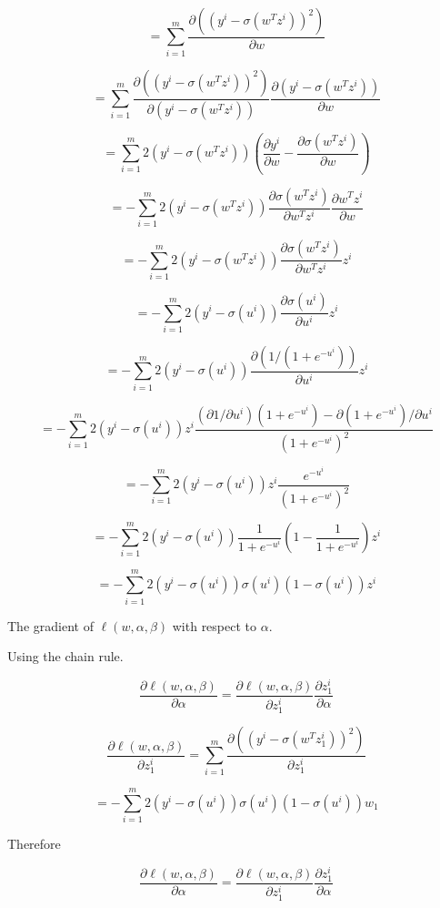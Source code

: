 \documentclass[twoside,10pt]{article}
\begin{document}
\begin{enumerate}
\begin{enumerate}
$$=\sum_{i=1}^m{\frac{\partial{((y^i - \sigma(w^T z^i))^2)}}{\partial{w}}}$$

$$=\sum_{i=1}^m{ \frac{\partial{((y^i - \sigma(w^T z^i))^2)}}{\partial{(y^i - \sigma(w^T z^i))}} \frac{\partial{(y^i - \sigma(w^T z^i))}}{\partial{w}} }$$

$$=\sum_{i=1}^m{2(y^i - \sigma(w^T z^i))(\frac{\partial{y^i}}{\partial{w}}   -   \frac{\partial{\sigma(w^T z^i)}}{\partial{w}})}$$

$$=- \sum_{i=1}^m{2(y^i - \sigma(w^T z^i)) \frac{\partial{\sigma(w^T z^i)}}{\partial{w^T z^i}} \frac{\partial{w^T z^i}}{\partial{w}}} $$

$$= - \sum_{i=1}^m{2(y^i - \sigma(w^T z^i)) \frac{\partial{\sigma(w^T z^i)}}{\partial{w^T z^i}} z^i}$$

$$=- \sum_{i=1}^m{2(y^i - \sigma(u^i)) \frac{\partial{\sigma(u^i)}}{\partial{u^i}} z^i} $$

$$=- \sum_{i=1}^m{2(y^i - \sigma(u^i)) \frac{\partial{(1/(1+e^{-u^i}))}}{\partial{u^i}} z^i} $$

$$=- \sum_{i=1}^m{2(y^i - \sigma(u^i)) z^i \frac{(\partial{1}/\partial{u^i})(1+e^{-u^i}) -  \partial{(1+e^{-u^i})} / \partial{u^i}} {(1+e^{-u^i})^2}} $$

$$=- \sum_{i=1}^m{2(y^i - \sigma(u^i)) z^i \frac{e^{-u^i}} {(1+e^{-u^i})^2}}$$

$$=- \sum_{i=1}^m{2(y^i - \sigma(u^i)) \frac{1}{1+e^{-u^i}} (1 - \frac{1}{1+e^{-u^i}}) z^i }$$

$$=- \sum_{i=1}^m 2(y^i - \sigma(u^i))\sigma(u^i)(1-\sigma(u^i)) z^i$$

\vspace{10 mm}
The gradient of $\ell(w, \alpha, \beta)$ with respect to $\alpha$.

\vspace{2 mm}

Using the chain rule.


$$\frac{\partial \ell(w, \alpha, \beta) }{\partial \alpha} = \frac{\partial \ell(w, \alpha, \beta) }{\partial z_1^i} \frac{\partial z_1^i}{\partial \alpha}$$


$$\frac{\partial \ell(w, \alpha, \beta) }{\partial z_1^i} = \sum_{i=1}^m {\frac{\partial ((y^i - \sigma(w^T z^i_1))^2) }{\partial z_1^i}}$$

$$=- \sum_{i=1}^m {2(y^i - \sigma(u^i))\sigma(u^i)(1-\sigma(u^i)) w_1}$$

Therefore

$$\frac{\partial \ell(w, \alpha, \beta) }{\partial \alpha} = \frac{\partial \ell(w, \alpha, \beta) }{\partial z_1^i} \frac{\partial z_1^i}{\partial \alpha} $$


\end{enumerate}
\end{enumerate}
\end{document}
